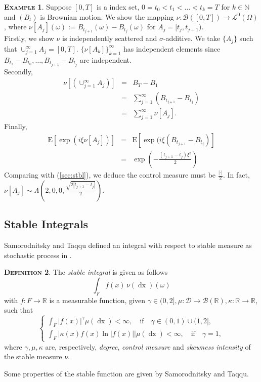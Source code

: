 \documentclass[a4paper, twoside, 11pt]{article}
\theoremstyle{definition}
\newtheorem{definition}{\scshape Definition}[section]
\newtheorem{example}[definition]{\scshape Example}
\newcommand{\brkt}[1]{\left({#1} \right)}
\begin{document}
\begin{example}
  Suppose $[0, T]$ is a index set, $0=t_0 < t_1 <\dots < t_k = T$ for $k\in \mathbb{N}$ and $(B_{t})$ is Brownian motion.  We show the mapping $\nu : \mathscr{B}([0, T]) \rightarrow \mathcal{L}^0(\Omega)$, where $\nu[A_j](\omega):= B_{t_{j+1}}(\omega) - B_{t_{j}}(\omega)$ for $A_j=[t_{j}, t_{j+1})$.\\
	Firstly, we show $\nu$ is independently scattered and $\sigma$-additive. We take $\{A_j\}$ such that $\cup_{j=1}^{\infty}A_j = [0, T]$. $\{\nu[A_k]\}_{k=1}^{\infty}$ has independent elements since $B_{t_1} - B_{t_0}, \dots,  B_{t_{j+1}}- B_{t_{j}} $ are independent.\\
	Secondly, 
	\begin{eqnarray*}
	  \nu[\brkt{\cup_{j=1}^{\infty}A_j}] &=& B_T - B_1\\
	  &=& \sum_{j=1}^{\infty} (B_{t_{j+1}} - B_{t_j})\\
	  &=& \sum_{j=1}^{\infty} \nu[A_j].
	\end{eqnarray*}
	Finally, 
	\begin{eqnarray*}
	  \mathrm{E}[\exp(i\xi\nu[A_j])] &=& \mathrm{E}[\exp(i\xi(B_{t_{j+1}} - B_{t_{j}})]\\
	  &=& \exp(-\frac{(t_{j+1}-t_j)\xi^2}{2})
	\end{eqnarray*}
	Comparing with (\ref{sec:stbl}), we deduce the control measure must be $\frac{|\cdot|}{2}$. In fact, $\nu[A_j] \sim \Lambda(2, 0, 0, \frac{\sqrt{2|t_{j+1} - t_j|}}{2})$.
  \label{sec:ex2}
\end{example}

\subsection{Stable Integrals}
Samorodnitsky and Taqqu defined an integral with respect to stable measure as stochastic process in \cite{samorodnitsky}. 
\begin{definition}
  The \emph{stable integral} is given as follows
\begin{equation}
  \int_F f(x)\, \nu(\mathop{dx}) (\omega)
  \label{sec:stbint}
\end{equation}
with $f : F \rightarrow \mathbb{R}$ is a measurable function, given $\gamma\in (0, 2], \mu : \mathscr{D}\rightarrow \mathscr{B}(\mathbb{R}), \kappa: \mathbb{R}\rightarrow \mathbb{R}$, such that 
\begin{equation}
\begin{cases} \int_F |f(x)|^\gamma \mu(\mathop{dx}) < \infty,\hspace{1em} \text{if} \hspace{1em} \gamma \in (0, 1) \cup (1, 2],\\
	\int_F |\kappa(x) f(x) \ln|f(x)||\mu(\mathop{dx}) < \infty,\hspace{1em} \text{if} \hspace{1em} \gamma = 1,
  \end{cases}
\end{equation}
where $\gamma, \mu , \kappa$ are, respectively, \emph{degree}, \emph{control measure} and \emph{skewness intensity} of the stable measure $\nu$.
\end{definition}
Some properties of the stable function are given by Samorodnitsky and Taqqu.
\end{document}
